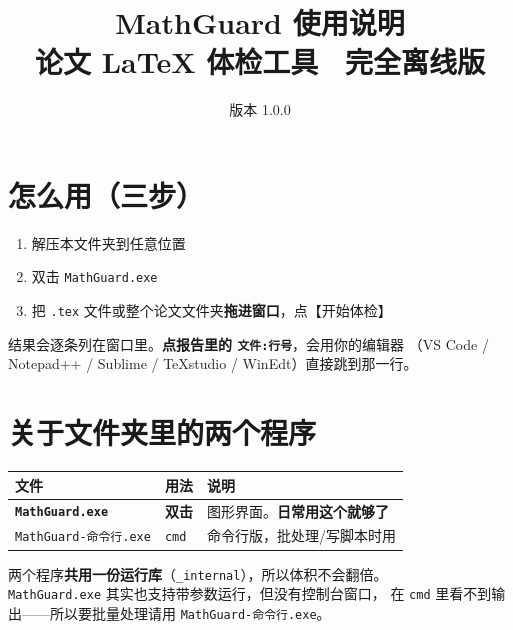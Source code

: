 \documentclass[11pt,UTF8]{ctexart}
\title{\textbf{MathGuard 使用说明}\\[4pt]
\large 论文 LaTeX 体检工具 \textperiodcentered\ 完全离线版}
\author{}
\date{版本 1.0.0}
\begin{document}
\maketitle
\vspace{-1.5em}
\begin{center}
\end{center}

\section{怎么用（三步）}
\begin{enumerate}
\item 解压本文件夹到任意位置
\item 双击 \texttt{MathGuard.exe}
\item 把 \texttt{.tex} 文件或整个论文文件夹\textbf{拖进窗口}，点【开始体检】
\end{enumerate}

结果会逐条列在窗口里。\textbf{点报告里的 \texttt{文件:行号}}，会用你的编辑器
（VS Code / Notepad++ / Sublime / TeXstudio / WinEdt）直接跳到那一行。

\section*{关于文件夹里的两个程序}
\begin{center}
\begin{tabular}{@{}llp{7.5cm}@{}}
\toprule
文件 & 用法 & 说明\\
\midrule
\textbf{\texttt{MathGuard.exe}} & \textbf{双击} & 图形界面。\textbf{日常用这个就够了}\\
\texttt{MathGuard-命令行.exe} & \texttt{cmd} & 命令行版，批处理/写脚本时用\\
\bottomrule
\end{tabular}
\end{center}

\begin{notebox}
两个程序\textbf{共用一份运行库}（\texttt{\_internal}），所以体积不会翻倍。\\[4pt]
\texttt{MathGuard.exe} 其实也支持带参数运行，但没有控制台窗口，
在 \texttt{cmd} 里看不到输出——所以要批量处理请用
\texttt{MathGuard-命令行.exe}。
\end{notebox}
\end{document}
